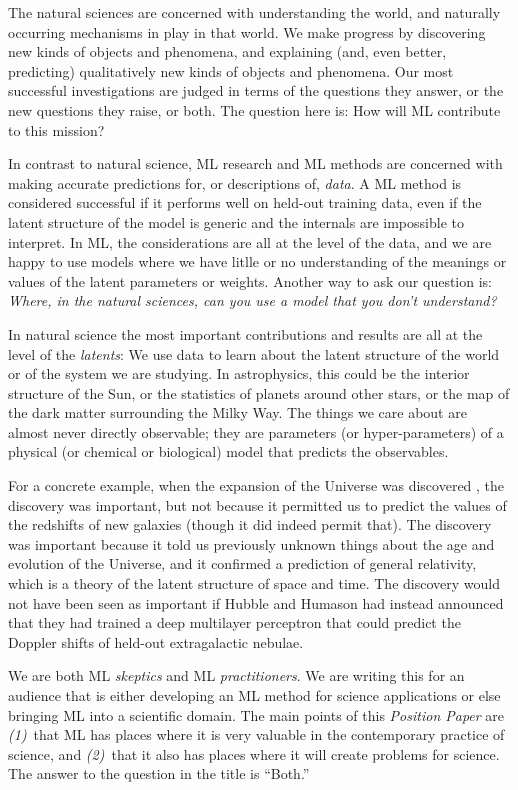 \documentclass[11pt]{article}
\newcommand{\documentname}{\textsl{Position Paper}}
\begin{document}
The natural sciences are concerned with understanding the world, and naturally occurring mechanisms in play in that world.
We make progress by discovering new kinds of objects and phenomena, and explaining (and, even better, predicting) qualitatively new kinds of objects and phenomena.
Our most successful investigations are judged in terms of the questions they answer, or the new questions they raise, or both.
The question here is: How will ML contribute to this mission?

In contrast to natural science, ML research and ML methods are concerned with making accurate predictions for, or descriptions of, \emph{data}.
A ML method is considered successful if it performs well on held-out training data, even if the latent structure of the model is generic and the internals are impossible to interpret.
In ML, the considerations are all at the level of the data, and we are happy to use models where we have litlle or no understanding of the meanings or values of the latent parameters or weights.
Another way to ask our question is:
\emph{Where, in the natural sciences, can you use a model that you don't understand?}

In natural science the most important contributions and results are all at the level of the \emph{latents}:
We use data to learn about the latent structure of the world or of the system we are studying.
In astrophysics, this could be the interior structure of the Sun, or the statistics of planets around other stars, or the map of the dark matter surrounding the Milky Way.
The things we care about are almost never directly observable; they are parameters (or hyper-parameters) of a physical (or chemical or biological) model that predicts the observables.

For a concrete example, when the expansion of the Universe was discovered \cite{expansion, expansion2}, the discovery was important, but not because it permitted us to predict the values of the redshifts of new galaxies (though it did indeed permit that).
The discovery was important because it told us previously unknown things about the age and evolution of the Universe, and it confirmed a prediction of general relativity, which is a theory of the latent structure of space and time.
The discovery would not have been seen as important if Hubble and Humason had instead announced that they had trained a deep multilayer perceptron that could predict the Doppler shifts of held-out extragalactic nebulae.

We are both ML \emph{skeptics} and ML \emph{practitioners}.
We are writing this for an audience that is either developing an ML method for science applications or else bringing ML into a scientific domain.
The main points of this \documentname{} are \textsl{(1)}~that ML has places where it is very valuable in the contemporary practice of science, and \textsl{(2)}~that it also has places where it will create problems for science.
The answer to the question in the title is ``Both.''
\end{document}
